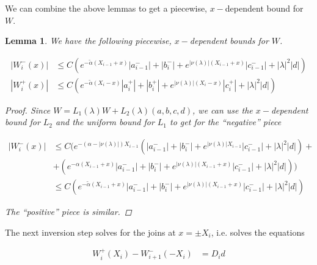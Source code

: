 \documentclass[12pt]{article}
\newtheorem{lemma}{Lemma}
\begin{document}

We can combine the above lemmas to get a piecewise, $x-$dependent bound for $W$.

\begin{lemma}\label{piecewiseW1}
We have the following piecewise, $x-$dependent bounds for $W$.

\begin{align}
|W_i^-(x)| &\leq C ( e^{-\tilde{\alpha}(X_{i-1} + x)}|a_{i-1}^-| + |b_i^-| + e^{|\nu(\lambda)|(X_{i-1} + x)} |c_{i-1}^-| + |\lambda|^2 |d| ) \\
|W_i^+(x)| &\leq C ( e^{-\tilde{\alpha}(X_i - x)}|a_i^+| + |b_i^+| + e^{|\nu(\lambda)|(X_i - x)} |c_i^+| + |\lambda|^2 |d| )
\end{align}

\begin{proof}
Since $W = L_1(\lambda) W + L_2(\lambda)(a,b,c,d)$, we can use the $x-$dependent bound for $L_2$ and the uniform bound for $L_1$ to get for the ``negative'' piece

\begin{align*}
|W_i^-(x)| &\leq C \Big( e^{-(\alpha -|\nu(\lambda)|)X_{i-1}} ( |a_{i-1}^-| + |b_i^-| + e^{|\nu(\lambda)|X_{i-1}}|c_{i-1}^-| + |\lambda|^2 |d| ) + \\
&+ (e^{-\alpha(X_{i-1} + x)}|a_{i-1}^-| + |b_i^-| + e^{|\nu(\lambda)|(X_{i-1} + x)} |c_{i-1}^-| + |\lambda|^2 |d| ) \Big) \\
&\leq C ( e^{-\tilde{\alpha}(X_{i-1} + x)}|a_{i-1}^-| + |b_i^-| + e^{|\nu(\lambda)|(X_{i-1} + x)} |c_{i-1}^-| + |\lambda|^2 |d| )
\end{align*}

The ``positive'' piece is similar.

\end{proof}
\end{lemma}

The next inversion step solves for the joins at $x = \pm X_i$, i.e. solves the equations

\begin{align*}
W_i^+(X_i) - W_{i+1}^-(-X_i) &= D_i d \\
\end{align*}

\end{document}
